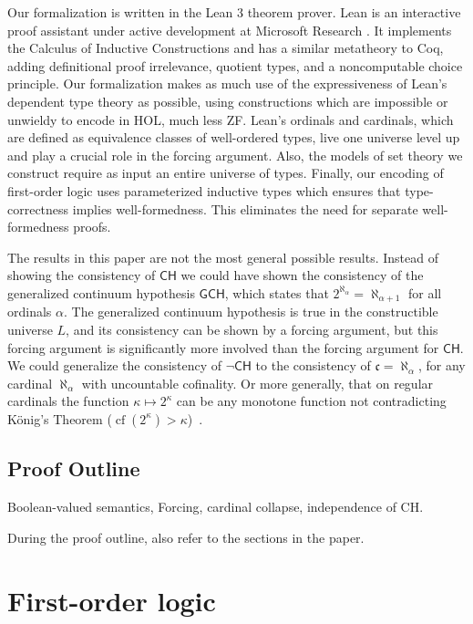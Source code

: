 \documentclass[sigplan,10pt,review, anonymous]{acmart}
\theoremstyle{definition}
\DeclareMathOperator{\cf}{cf}
\begin{document}
Our formalization is written in the Lean 3 theorem prover.
Lean is an interactive proof assistant under active development at Microsoft Research \cite{de2015lean, sebastian1}.
It implements the Calculus of Inductive Constructions and has a similar metatheory to Coq, adding definitional proof irrelevance, quotient types, and a noncomputable choice principle.
Our formalization makes as much use of the expressiveness of Lean's dependent type theory as possible, using constructions which are impossible or unwieldy to encode in HOL, much less ZF. Lean's ordinals and cardinals, which are defined as equivalence classes of well-ordered types, live one universe level up and play a crucial role in the forcing argument.
Also, the models of set theory we construct require as input an entire universe of types.
Finally, our encoding of first-order logic uses parameterized inductive types which ensures that type-correctness implies well-formedness. This eliminates the need for separate well-formedness proofs.

The results in this paper are not the most general possible results.
Instead of showing the consistency of $\mathsf{CH}$ we could have shown the consistency of the generalized continuum hypothesis $\mathsf{GCH}$, which states that $2^{\aleph_\alpha}=\aleph_{\alpha+1}$ for all ordinals $\alpha$.
The generalized continuum hypothesis is true in the constructible universe $L$, and its consistency can be shown by a forcing argument, but this forcing argument is significantly more involved than the forcing argument for $\mathsf{CH}$.
We could generalize the consistency of $\neg \mathsf{CH}$ to the consistency of $\mathfrak{c}=\aleph_\alpha$, for any cardinal $\aleph_\alpha$ with uncountable cofinality.
Or more generally, that on regular cardinals the function $\kappa\mapsto 2^\kappa$ can be any monotone function not contradicting K\"onig's Theorem ($\cf(2^\kappa)>\kappa$)~\cite{easton1970powers}.

\subsection{Proof Outline}
\label{subsection:intro:outline}
Boolean-valued semantics, Forcing, cardinal collapse, independence of CH.

During the proof outline, also refer to the sections in the paper.
\section{First-order logic}
\label{section:fol}
\end{document}
